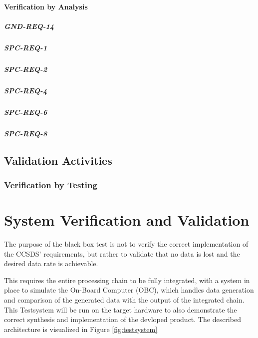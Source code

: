 \subsubsection{Verification by Analysis}

\paragraph{GND-REQ-14}
\paragraph{SPC-REQ-1}
\paragraph{SPC-REQ-2}
\paragraph{SPC-REQ-4}
\paragraph{SPC-REQ-6}
\paragraph{SPC-REQ-8}

\section{Validation Activities}

\subsection{Verification by Testing}


\chapter{System Verification and Validation}
The purpose of the black box test is not to verify the correct implementation of the CCSDS' requirements, but rather to validate that no data is lost and the desired data rate is achievable. 

This requires the entire processing chain to be fully integrated, with a system in place to simulate the On-Board Computer (OBC), which handles data generation and comparison of the generated data with the output of the integrated chain. This Testsystem will be run on the target hardware to also demonstrate the correct synthesis and implementation of the devloped product. The described architecture is visualized in Figure \ref{fig:testsystem}

